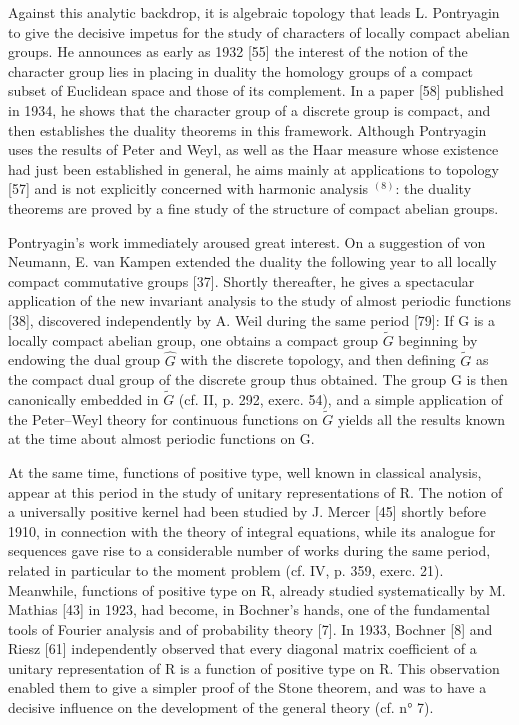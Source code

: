 Against this analytic backdrop, it is algebraic topology that leads L. Pontryagin to give the decisive impetus for the study of characters of locally compact abelian groups. He announces as early as 1932 {[}55{]} the interest of the notion of the character group lies in placing in duality the homology groups of a compact subset of Euclidean space and those of its complement. In a paper {[}58{]} published in 1934, he shows that the character group of a discrete group is compact, and then establishes the duality theorems in this framework. Although Pontryagin uses the results of Peter and Weyl, as well as the Haar measure whose existence had just been established in general, he aims mainly at applications to topology {[}57{]} and is not explicitly concerned with harmonic analysis \(^{(8)}\): the duality theorems are proved by a fine study of the structure of compact abelian groups.

Pontryagin's work immediately aroused great interest. On a suggestion of von Neumann, E. van Kampen extended the duality the following year to all locally compact commutative groups {[}37{]}. Shortly thereafter, he gives a spectacular application of the new invariant analysis to the study of almost periodic functions {[}38{]}, discovered independently by A. Weil during the same period {[}79{]}: If G is a locally compact abelian group, one obtains a compact group \(\widetilde{G}\) beginning by endowing the dual group \(\widehat{G}\) with the discrete topology, and then defining \(\widetilde{G}\) as the compact dual group of the discrete group thus obtained. The group G is then canonically embedded in \(\widetilde{G}\) (cf. II, p. 292, exerc. 54), and a simple application of the Peter--Weyl theory for continuous functions on \(\widetilde{G}\) yields all the results known at the time about almost periodic functions on G.

At the same time, functions of positive type, well known in classical analysis, appear at this period in the study of unitary representations of R. The notion of a universally positive kernel had been studied by J. Mercer {[}45{]} shortly before 1910, in connection with the theory of integral equations, while its analogue for sequences gave rise to a considerable number of works during the same period, related in particular to the moment problem (cf. IV, p. 359, exerc. 21). Meanwhile, functions of positive type on R, already studied systematically by M. Mathias {[}43{]} in 1923, had become, in Bochner's hands, one of the fundamental tools of Fourier analysis and of probability theory {[}7{]}. In 1933, Bochner {[}8{]} and Riesz {[}61{]} independently observed that every diagonal matrix coefficient of a unitary representation of R is a function of positive type on R. This observation enabled them to give a simpler proof of the Stone theorem, and was to have a decisive influence on the development of the general theory (cf. n° 7).

